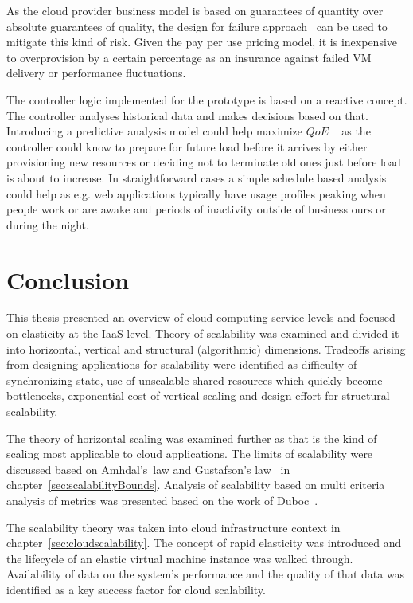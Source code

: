 \documentclass[english]{tktltiki2}
\theoremstyle{definition}
\theoremstyle{remark}
\begin{document}
As the cloud provider business model is based on guarantees of quantity over
absolute guarantees of quality, the design for failure approach~\cite{Varia2010}
can be used to mitigate this kind of risk. Given the pay per use pricing model,
it is inexpensive to overprovision by a certain percentage as an insurance
against failed VM delivery or performance fluctuations.

The controller logic implemented for the prototype is based on a reactive
concept. The controller analyses historical data and makes decisions based on
that. Introducing a predictive analysis model could help maximize $QoE$
~\cite{cloudberkeleyviewacm} as the controller could know to prepare for future
load before it arrives by either provisioning new resources or deciding not to
terminate old ones just before load is about to increase. In straightforward cases
a simple schedule based analysis could help as e.g. web applications typically
have usage profiles peaking when people work or are awake and periods of
inactivity outside of business ours or during the night.

\section{Conclusion}
\label{sec:conclusion}

This thesis presented an overview of cloud computing service levels and focused
on elasticity at the IaaS level. Theory of scalability was examined and divided
it into horizontal, vertical and structural (algorithmic) dimensions. Tradeoffs
arising from designing applications for scalability were identified as
difficulty of synchronizing state, use of unscalable shared resources which
quickly become bottlenecks, exponential cost of vertical scaling and design
effort for structural scalability.

The theory of horizontal scaling was examined further as that is the kind of
scaling most applicable to cloud applications. The limits of scalability were
discussed based on Amhdal's~law \cite{amdahlslaw} and Gustafson's
law~\cite{gustafsonslaw} in chapter~\ref{sec:scalabilityBounds}. Analysis of
scalability based on multi criteria analysis of metrics was presented based on
the work of Duboc~\cite{Duboc2007}.

The scalability theory was taken into cloud infrastructure context in
chapter~\ref{sec:cloudscalability}. The concept of rapid elasticity was
introduced and the lifecycle of an elastic virtual machine instance was
walked through. Availability of data on the system's performance and the quality of
that data was identified as a key success factor for cloud scalability.
\end{document}
